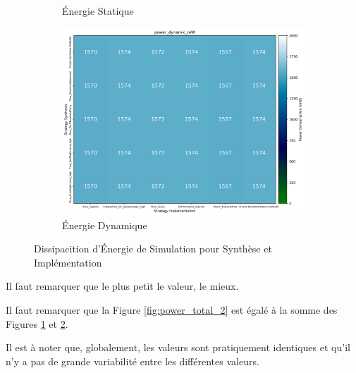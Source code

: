 \documentclass[../CSC_5RO07_TA.tex]{subfiles}
\begin{document}
\begin{figure}[h]
\begin{subfigure}[b]{0.30\textwidth}
        \caption{Énergie Statique}
        \label{fig:power_static_2}
    \end{subfigure}\hfill
    \begin{subfigure}[b]{0.30\textwidth}
        \centering
        \includegraphics[width=\linewidth]{images/2_power_dynamic_mW.png}
        \caption{Énergie Dynamique}
        \label{fig:power_dynamic_2}
    \end{subfigure}
    \caption{Dissipacition d'Énergie de Simulation pour Synthèse et Implémentation}
    \label{fig:power_2}
\end{figure}
\begin{remark}
    Il faut remarquer que le plus petit le valeur, le mieux.
\end{remark}
\begin{remark}
    Il faut remarquer que la Figure \ref{fig:power_total_2} est égalé à la somme des Figures \ref{fig:power_static_2} et \ref{fig:power_dynamic_2}.
\end{remark}
\noindent Il est à noter que, globalement, les valeurs sont pratiquement identiques et qu'il n'y a pas de grande variabilité entre les différentes valeurs.\\
\end{document}
